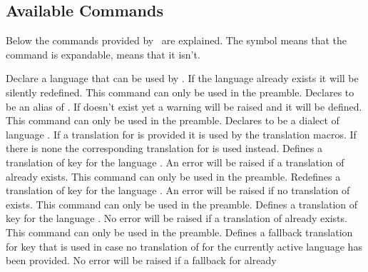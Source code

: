 \documentclass[DIV11,toc=index,toc=bib,numbers=noendperiod]{cnpkgdoc}
\newcommand*\unexpsign{{\tiny\FiveStar}}
\newcommand*\expsign{\textcolor{red}{{\tiny\FiveStar}}}
\begin{document}
\subsection{Available Commands}\label{ssec:commands}
Below the commands provided by \translations\ are explained.  The symbol
\expsign{} means that the command is expandable, \unexpsign{} means that it
isn't.
\begin{beschreibung}
 \newline
   Declare a language that can be used by \translations. If the language
   already exists it will be silently redefined. This command can only be used
   in the preamble.
 \newline
   Declares  to be an alias of . If 
   doesn't exist yet a warning will be raised and it will be defined. This
   command can only be used in the preamble.
 \newline
   Declares  to be a dialect of language . If a
   translation for  is provided it is used by the translation
   macros. If there is none the corresponding translation for  is
   used instead.
 \newline
   Defines a translation of key  for the language .
   An error will be raised if a translation of  already exists.
   This command can only be used in the preamble.
 \newline
   Redefines a translation of key  for the language .
   An error will be raised if no translation of  exists.
   This command can only be used in the preamble.
 \newline
   Defines a translation of key  for the language .
   No error will be raised if a translation of  already exists.
   This command can only be used in the preamble.
 \newline
   Defines a fallback translation for key  that is used in case no
   translation of  for the currently active language has been
   provided.  No error will be raised if a fallback for  already

\end{beschreibung}
\end{document}
